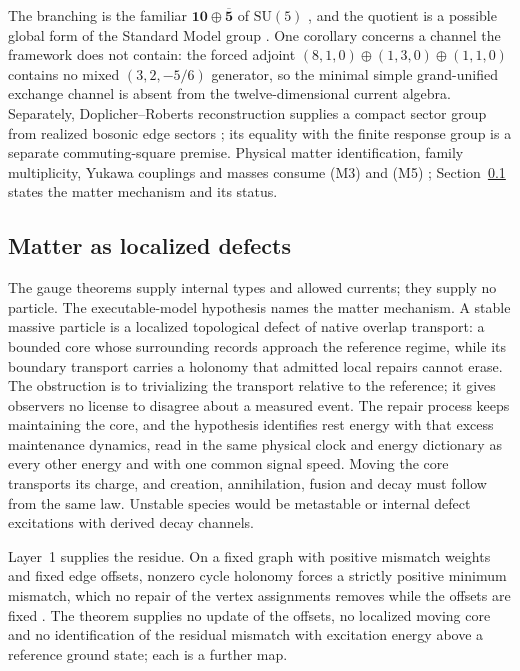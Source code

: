 \documentclass[11pt]{article}
\theoremstyle{definition}
\theoremstyle{remark}
\begin{document}
The branching is the familiar $\mathbf{10}\oplus\overline{\mathbf5}$ of
$\mathrm{SU}(5)$ \cite{georgi1974}, and the quotient is a possible global
form of the Standard Model group \cite{tong2017}. One corollary concerns a
channel the framework does not contain: the forced adjoint
$(8,1,0)\oplus(1,3,0)\oplus(1,1,0)$ contains no mixed $(3,2,-5/6)$
generator, so the minimal simple grand-unified exchange channel is absent
from the twelve-dimensional current algebra. Separately, Doplicher--Roberts
reconstruction supplies a compact sector group from realized bosonic edge
sectors \cite{dr89,dr90}; its equality with the finite response group is a
separate commuting-square premise. Physical matter identification, family
multiplicity, Yukawa couplings and masses consume (M3) and (M5)
\cite{ophGauge}; Section~\ref{sec:defects} states the matter mechanism and
its status.

\subsection{Matter as localized defects}
\label{sec:defects}

The gauge theorems supply internal types and allowed currents; they supply
no particle. The executable-model hypothesis names the matter mechanism. A
stable massive particle is a localized topological defect of native overlap
transport: a bounded core whose surrounding records approach the reference
regime, while its boundary transport carries a holonomy that admitted local
repairs cannot erase. The obstruction is to trivializing the transport
relative to the reference; it gives observers no license to disagree about a
measured event. The repair process keeps maintaining the core, and the
hypothesis identifies rest energy with that excess maintenance dynamics,
read in the same physical clock and energy dictionary as every other energy
and with one common signal speed. Moving the core transports its charge, and
creation, annihilation, fusion and decay must follow from the same law.
Unstable species would be metastable or internal defect excitations with
derived decay channels.

Layer~1 supplies the residue. On a fixed graph with positive mismatch
weights and fixed edge offsets, nonzero cycle holonomy forces a strictly
positive minimum mismatch, which no repair of the vertex assignments removes
while the offsets are fixed \cite{ophconsensus}. The theorem supplies no
update of the offsets, no localized moving core and no identification of the
residual mismatch with excitation energy above a reference ground state;
each is a further map.
\end{document}
